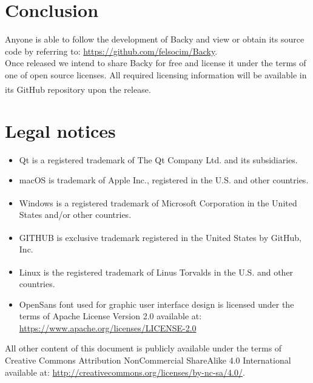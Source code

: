 \documentclass[a4paper]{article}
\begin{document}
  \section{Conclusion}
    Anyone is able to follow the development of Backy and view or obtain its source code by referring to: \url{https://github.com/felsocim/Backy}. \\
    \indent Once released we intend to share Backy for free and license it under the terms of one of open source licenses. All required licensing information will be available in its GitHub\textsuperscript{\textregistered} repository upon the release.
  \section{Legal notices}
    \begin{itemize}
      \item Qt is a registered trademark of The Qt Company Ltd. and its subsidiaries.
      \item macOS is trademark of Apple Inc., registered in the U.S. and other countries.
      \item Windows\textsuperscript{\textregistered} is a registered trademark of Microsoft Corporation in the United States and/or other countries.
      \item GITHUB\textsuperscript{\textregistered} is exclusive trademark registered in the United States by GitHub, Inc.
      \item Linux\textsuperscript{\textregistered} is the registered trademark of Linus Torvalds in the U.S. and other countries.
      \item OpenSans font used for graphic user interface design is licensed under the terms of Apache License Version 2.0 available at: \url{https://www.apache.org/licenses/LICENSE-2.0}
    \end{itemize}
    All other content of this document is publicly available under the terms of Creative Commons Attribution NonCommercial ShareAlike 4.0 International available at: \url{http://creativecommons.org/licenses/by-nc-sa/4.0/}.                 
\end{document}

